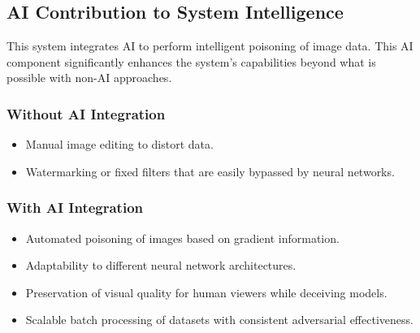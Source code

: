 \subsection{AI Contribution to System Intelligence}

This system integrates AI to perform intelligent poisoning of image data. 
This AI component significantly enhances the system’s capabilities beyond what 
is possible with non-AI approaches.

\subsubsection{Without AI Integration}
\begin{itemize}
    \item Manual image editing to distort data.
    \item Watermarking or fixed filters that are easily bypassed by neural networks.
\end{itemize}

\subsubsection{With AI Integration}
\begin{itemize}
    \item Automated poisoning of images based on gradient information.
    \item Adaptability to different neural network architectures.
    \item Preservation of visual quality for human viewers while deceiving models.
    \item Scalable batch processing of datasets with consistent adversarial effectiveness.
\end{itemize}

